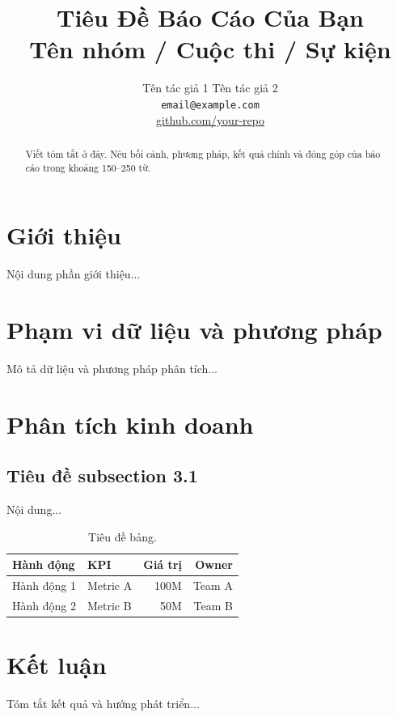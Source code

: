 \documentclass[10pt,twocolumn]{article}
\title{
    \large\textbf{Tiêu Đề Báo Cáo Của Bạn} \\[0.5em]
    \normalsize Tên nhóm / Cuộc thi / Sự kiện
}
\author{
    Tên tác giả 1 \quad Tên tác giả 2 \\
    \small \texttt{email@example.com} \\
    \small \url{github.com/your-repo}
}
\date{}  %
\begin{document}
\maketitle

\begin{abstract}
Viết tóm tắt ở đây. Nêu bối cảnh, phương pháp, kết quả chính
và đóng góp của báo cáo trong khoảng 150--250 từ.
\end{abstract}

\section{Giới thiệu}
Nội dung phần giới thiệu...

\section{Phạm vi dữ liệu và phương pháp}
Mô tả dữ liệu và phương pháp phân tích...

\section{Phân tích kinh doanh}

\subsection{Tiêu đề subsection 3.1}
Nội dung...



\begin{table}[H]
    \centering
    \caption{Tiêu đề bảng.}
    \label{tab:table1}
    \begin{tabular}{llrr}
        \toprule
        Hành động & KPI & Giá trị & Owner \\
        \midrule
        Hành động 1 & Metric A & 100M & Team A \\
        Hành động 2 & Metric B & 50M  & Team B \\
        \bottomrule
    \end{tabular}
\end{table}

\section{Kết luận}
Tóm tắt kết quả và hướng phát triển...



\end{document}
